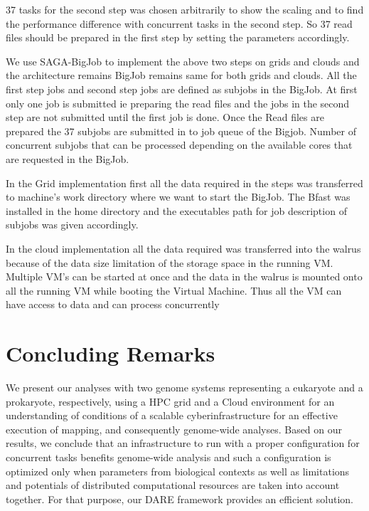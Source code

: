 \documentclass[12pt]{article}
\begin{document}
37 tasks for the second step was chosen arbitrarily to show the scaling  and to find the performance 
difference with concurrent tasks in the second step. So 37 read files should be prepared in the
 first step by setting the parameters accordingly.

We use SAGA-BigJob to implement the above two steps on grids and clouds and 
the architecture remains BigJob remains same for both grids and clouds. All the first 
step jobs and second step jobs are defined as subjobs in the BigJob. At first only 
one job is submitted ie  preparing the read files and the jobs in the second step are not submitted
until the first job is done. Once the Read files are prepared the 37 subjobs are submitted in to 
job queue of the Bigjob. Number of concurrent subjobs that can be processed depending 
on the available cores that are requested in the BigJob.
  
In the Grid implementation first all the data required in the steps was transferred to machine's  work 
directory where we want to start the BigJob. The Bfast was installed in the home directory and the
executables path for job description of subjobs was given accordingly.

In the cloud implementation all the data required was transferred into the walrus because of the data size limitation of the storage space in the
running VM. Multiple VM's can be started at once and the data in the walrus is mounted onto all the running VM
while booting the Virtual Machine. Thus all the VM can have access to data and can process concurrently



\section{Concluding Remarks}
We present our analyses with two genome systems representing a eukaryote and a prokaryote, respectively, using
 a HPC grid and a Cloud environment for an understanding of conditions of a scalable cyberinfrastructure for an effective execution of
 mapping, and consequently genome-wide analyses.   Based on our results, we conclude that an infrastructure to run with a proper configuration for concurrent tasks benefits genome-wide analysis and such a configuration is optimized only when parameters from biological contexts as well as limitations and potentials of distributed computational resources are taken into account together.  For that purpose, our DARE framework provides an efficient solution.  





\end{document}
